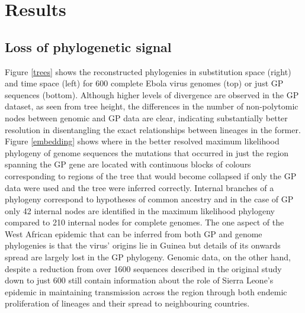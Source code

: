 \documentclass{bmcart}
\begin{document}
\section*{Results}

\subsection*{Loss of phylogenetic signal}

Figure \ref{trees} shows the reconstructed phylogenies in substitution space (right) and time space (left) for 600 complete Ebola virus genomes (top) or just GP sequences (bottom).
Although higher levels of divergence are observed in the GP dataset, as seen from tree height, the differences in the number of non-polytomic nodes between genomic and GP data are clear, indicating substantially better resolution in disentangling the exact relationships between lineages in the former.
Figure \ref{embedding} shows where in the better resolved maximum likelihood phylogeny of genome sequences the mutations that occurred in just the region spanning the GP gene are located with continuous blocks of colours corresponding to regions of the tree that would become collapsed if only the GP data were used and the tree were inferred correctly.
Internal branches of a phylogeny correspond to hypotheses of common ancestry and in the case of GP only 42 internal nodes are identified in the maximum likelihood phylogeny compared to 210 internal nodes for complete genomes.
The one aspect of the West African epidemic that can be inferred from both GP and genome phylogenies is that the virus' origins lie in Guinea but details of its onwards spread are largely lost in the GP phylogeny.
Genomic data, on the other hand, despite a reduction from over 1600 sequences described in the original study \cite{dudas_virus_2017} down to just 600 still contain information about the role of Sierra Leone's epidemic in maintaining transmission across the region through both endemic proliferation of lineages and their spread to neighbouring countries.
\end{document}
